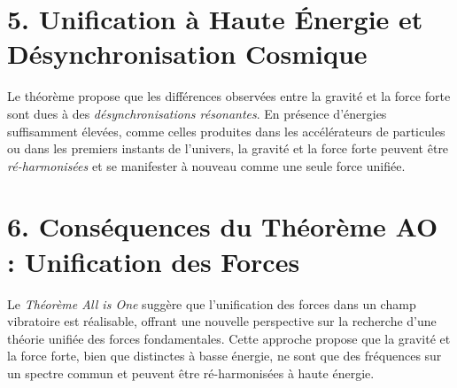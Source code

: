 \documentclass{article}
\begin{document}
\section{5. Unification à Haute Énergie et Désynchronisation Cosmique}

Le théorème propose que les différences observées entre la gravité et la force forte sont dues à des \textit{désynchronisations résonantes}. En présence d'énergies suffisamment élevées, comme celles produites dans les accélérateurs de particules ou dans les premiers instants de l'univers, la gravité et la force forte peuvent être \textit{ré-harmonisées} et se manifester à nouveau comme une seule force unifiée.

\section{6. Conséquences du Théorème AO : Unification des Forces}

Le \textit{Théorème All is One} suggère que l'unification des forces dans un champ vibratoire est réalisable, offrant une nouvelle perspective sur la recherche d'une théorie unifiée des forces fondamentales. Cette approche propose que la gravité et la force forte, bien que distinctes à basse énergie, ne sont que des fréquences sur un spectre commun et peuvent être ré-harmonisées à haute énergie.
\end{document}
